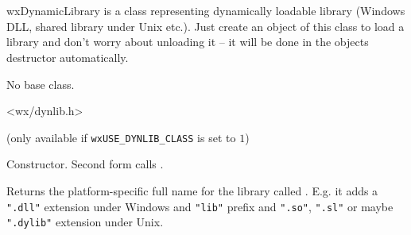 
\section{}\label{wxdynamiclibrary}

wxDynamicLibrary is a class representing dynamically loadable library
(Windows DLL, shared library under Unix etc.). Just create an object of
this class to load a library and don't worry about unloading it -- it will be
done in the objects destructor automatically.

%
%


No base class.


<wx/dynlib.h>

(only available if \texttt{wxUSE\_DYNLIB\_CLASS} is set to $1$)


\label{wxdynamiclibrarywxdynamiclibrary}



Constructor. Second form calls .


\label{wxdynamiclibrarycanonicalizename}


Returns the platform-specific full name for the library called . E.g.
it adds a {\tt ".dll"} extension under Windows and {\tt "lib"} prefix and 
{\tt ".so"}, {\tt ".sl"} or maybe {\tt ".dylib"} extension under Unix.

